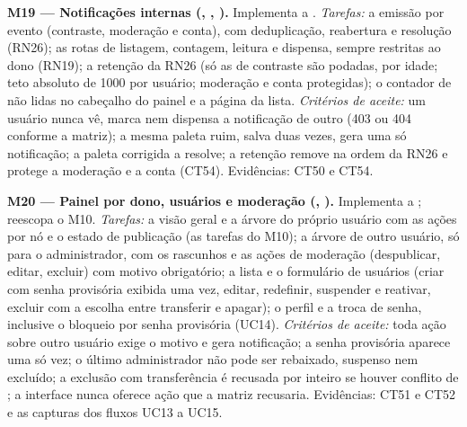 \textbf{M19 --- Notificações internas (, , ).} Implementa a . \emph{Tarefas:} a emissão por evento (contraste, moderação e conta), com deduplicação, reabertura e resolução (RN26); as rotas de listagem, contagem, leitura e dispensa, sempre restritas ao dono (RN19); a retenção da RN26 (só as de contraste são podadas, por idade; teto absoluto de 1000 por usuário; moderação e conta protegidas); o contador de não lidas no cabeçalho do painel e a página da lista. \emph{Critérios de aceite:} um usuário nunca vê, marca nem dispensa a notificação de outro (403 ou 404 conforme a matriz); a mesma paleta ruim, salva duas vezes, gera uma só notificação; a paleta corrigida a resolve; a retenção remove na ordem da RN26 e protege a moderação e a conta (CT54). Evidências: CT50 e CT54.

\textbf{M20 --- Painel por dono, usuários e moderação (, ).} Implementa a ; reescopa o M10. \emph{Tarefas:} a visão geral e a árvore do próprio usuário com as ações por nó e o estado de publicação (as tarefas do M10); a árvore de outro usuário, só para o administrador, com os rascunhos e as ações de moderação (despublicar, editar, excluir) com motivo obrigatório; a lista e o formulário de usuários (criar com senha provisória exibida uma vez, editar, redefinir, suspender e reativar, excluir com a escolha entre transferir e apagar); o perfil e a troca de senha, inclusive o bloqueio por senha provisória (UC14). \emph{Critérios de aceite:} toda ação sobre outro usuário exige o motivo e gera notificação; a senha provisória aparece uma só vez; o último administrador não pode ser rebaixado, suspenso nem excluído; a exclusão com transferência é recusada por inteiro se houver conflito de ; a interface nunca oferece ação que a matriz recusaria. Evidências: CT51 e CT52 e as capturas dos fluxos UC13 a UC15.

